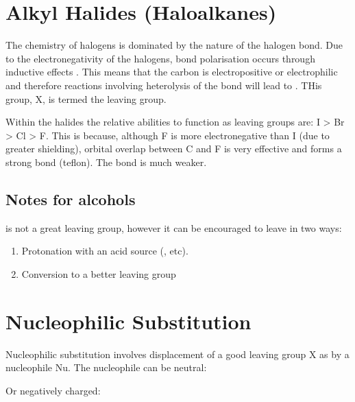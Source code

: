 \section{Alkyl Halides (Haloalkanes)}

The chemistry of halogens is dominated by the nature of the halogen bond. Due to
the electronegativity of the halogens, bond polarisation occurs through inductive
effects . This means that the carbon is
electropositive or electrophilic and therefore reactions involving heterolysis
of the  bond will lead to . THis group, X, is termed the leaving
group.

Within the halides the relative abilities to function as leaving groups are:
I > Br > Cl > F. This is because, although F is more electronegative than I (due
to greater shielding), orbital overlap between C and F is very effective and forms
a strong bond (teflon). The  bond is much weaker.

\subsection{Notes for alcohols}

 is not a great leaving group, however it can be encouraged to leave in two
ways:

\begin{enumerate}[label=\alph*)]

  \item Protonation with an acid source (, etc).

  \item Conversion to a better leaving group

\end{enumerate}


\pagebreak
\section{Nucleophilic Substitution}

Nucleophilic substitution involves displacement of a good leaving group X as
 by a nucleophile Nu. The nucleophile can be neutral:

\begin{center}
\end{center}

Or negatively charged:

